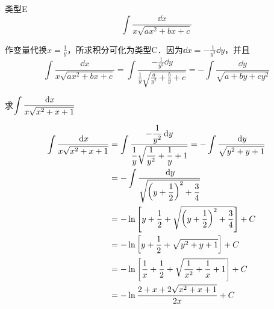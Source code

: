\begin{blk}{类型E}
    \[\int \frac{\dd x}{x\sqrt{ax^2+bx+c}}\]
\end{blk}

作变量代换$x=\frac{1}{y}$，所求积分可化为类型C．因为$\dd x=-\frac{1}{y^2}\dd y$，并且
\[\int \frac{\dd x}{x\sqrt{ax^2+bx+c}}=\int\frac{-\frac{1}{y^2}\dd y}{\frac{1}{y}\sqrt{\frac{a}{y^2}+\frac{b}{y}+c}}=-\int\frac{\dd y}{\sqrt{a+by+cy^2}}\]

\begin{example}
    求$\displaystyle\int\dfrac{\,{\rm d} x}{x\sqrt{x^2+x+1}}$
\end{example}

\begin{solution}
\[\begin{split}
    \displaystyle\int\dfrac{\,{\rm d} x}{x\sqrt{x^2+x+1}}&=\int \dfrac{-\dfrac{1}{y^2}\,{\rm d} y}{\dfrac{1}{y}\sqrt{\dfrac{1}{y^2}+\dfrac{1}{y}+1}}=-\int \dfrac{\,{\rm d} y}{\sqrt{y^2+y+1}}\\
    &=-\int \dfrac{\,{\rm d} y }{\sqrt{\left(y+\dfrac{1}{2}\right)^2+\dfrac{3}{4}}}  \\
    &=-\ln \left[y+\dfrac{1}{2}+\sqrt{\left(y+\dfrac{1}{2}\right)^2+\dfrac{3}{4}}\right]+C \\
    &=-\ln \left[y+\dfrac{1}{2}+\sqrt{y^2+y+1}\right]+C\\
    &=-\ln\left[\dfrac{1}{x}+\dfrac{1}{2}+\sqrt{\dfrac{1}{x^2}+\dfrac{1}{x}+1}\right]+C\\
    &=-\ln\dfrac{2+x+2\sqrt{x^2+x+1}}{2x}+C
\end{split}\]
\end{solution}
    
